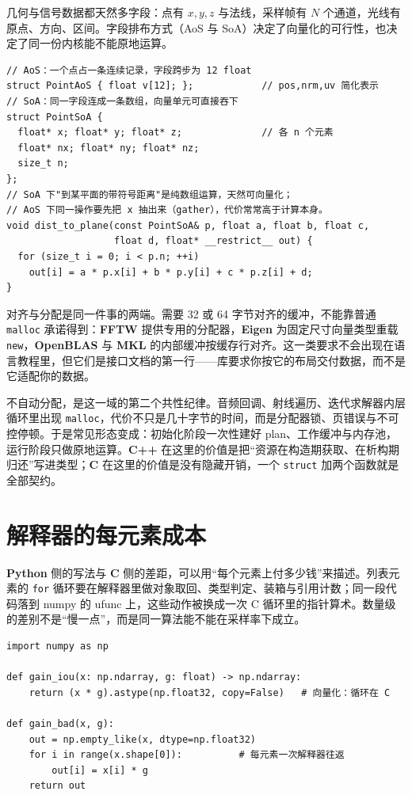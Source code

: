 \documentclass[12pt,a4paper,fontset=fandol]{ctexbook}
\newcommand{\Tp}[1]{\texttt{#1}}
\newcommand{\Lib}[1]{\textbf{#1}}
\newcommand{\Lang}[1]{\textsf{\bfseries #1}}
\newcommand{\CL}{\Lang{C}}
\newcommand{\CPP}{\Lang{C++}}
\newcommand{\PY}{\Lang{Python}}
\begin{document}
几何与信号数据都天然多字段：点有 $x,y,z$ 与法线，采样帧有 $N$ 个通道，光线有原点、方向、区间。字段排布方式（AoS 与 SoA）决定了向量化的可行性，也决定了同一份内核能不能原地运算。

\begin{lstlisting}[style=cppstyle,caption={同一批点的两种布局：AoS 便于遍历物体，SoA 便于向量化},label={lst:ch01-layout}]
// AoS：一个点占一条连续记录，字段跨步为 12 float
struct PointAoS { float v[12]; };            // pos,nrm,uv 简化表示
// SoA：同一字段连成一条数组，向量单元可直接吞下
struct PointSoA {
  float* x; float* y; float* z;              // 各 n 个元素
  float* nx; float* ny; float* nz;
  size_t n;
};
// SoA 下"到某平面的带符号距离"是纯数组运算，天然可向量化；
// AoS 下同一操作要先把 x 抽出来（gather），代价常常高于计算本身。
void dist_to_plane(const PointSoA& p, float a, float b, float c,
                   float d, float* __restrict__ out) {
  for (size_t i = 0; i < p.n; ++i)
    out[i] = a * p.x[i] + b * p.y[i] + c * p.z[i] + d;
}
\end{lstlisting}

对齐与分配是同一件事的两端。需要 32 或 64 字节对齐的缓冲，不能靠普通 \Tp{malloc} 承诺得到：\Lib{FFTW} 提供专用的分配器，\Lib{Eigen} 为固定尺寸向量类型重载 \Tp{new}，\Lib{OpenBLAS} 与 \Lib{MKL} 的内部缓冲按缓存行对齐。这一类要求不会出现在语言教程里，但它们是接口文档的第一行——库要求你按它的布局交付数据，而不是它适配你的数据。

不自动分配，是这一域的第二个共性纪律。音频回调、射线遍历、迭代求解器内层循环里出现 \Tp{malloc}，代价不只是几十字节的时间，而是分配器锁、页错误与不可控停顿。于是常见形态变成：初始化阶段一次性建好 plan、工作缓冲与内存池，运行阶段只做原地运算。\CPP{} 在这里的价值是把``资源在构造期获取、在析构期归还''写进类型；\CL{} 在这里的价值是没有隐藏开销，一个 \Tp{struct} 加两个函数就是全部契约。

\section{解释器的每元素成本}

\PY{} 侧的写法与 \CL{} 侧的差距，可以用``每个元素上付多少钱''来描述。列表元素的 \Tp{for} 循环要在解释器里做对象取回、类型判定、装箱与引用计数；同一段代码落到 numpy 的 ufunc 上，这些动作被换成一次 C 循环里的指针算术。数量级的差别不是``慢一点''，而是同一算法能不能在采样率下成立。

\begin{lstlisting}[style=pythonstyle,caption={两种写法的分工：循环留在 C，编排留在 Python},label={lst:ch01-py}]
import numpy as np

def gain_iou(x: np.ndarray, g: float) -> np.ndarray:
    return (x * g).astype(np.float32, copy=False)   # 向量化：循环在 C

def gain_bad(x, g):
    out = np.empty_like(x, dtype=np.float32)
    for i in range(x.shape[0]):          # 每元素一次解释器往返
        out[i] = x[i] * g
    return out
\end{lstlisting}
\end{document}
